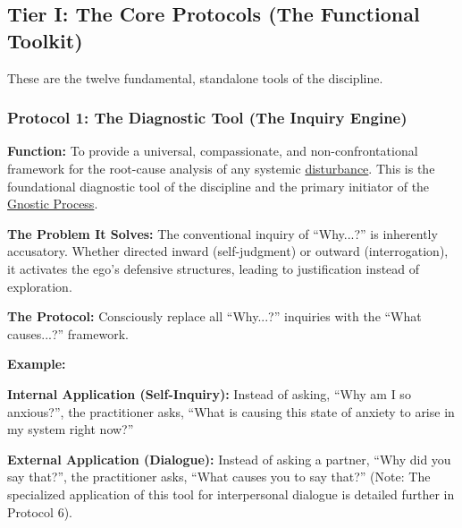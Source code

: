 \documentclass{article}
\begin{document}
\subsection*{Tier I: The Core Protocols (The Functional Toolkit)}
These are the twelve fundamental, standalone tools of the discipline.

\subsubsection*{Protocol 1: The Diagnostic Tool (The Inquiry Engine)} \label{protocol_1_the_diagnostic_tool_the_inquiry_engine}
\begin{nobullet}
        \item \textbf{Function:} To provide a universal, compassionate, and non-confrontational framework for the root-cause analysis of any systemic \hyperlink{gloss:disturbance}{disturbance}. This is the foundational diagnostic tool of the discipline and the primary initiator of the \hyperlink{gloss:gnostic_process}{Gnostic Process}.

        \item \textbf{The Problem It Solves:} The conventional inquiry of ``Why...?'' is inherently accusatory. Whether directed inward (self-judgment) or outward (interrogation), it activates the ego's defensive structures, leading to justification instead of exploration.

        \item \textbf{The Protocol:} Consciously replace all ``Why...?'' inquiries with the ``What causes...?'' framework.

        \bigskip
        \item \textbf{Example:}~
        \begin{nobullet}
            \item \textbf{Internal Application (Self-Inquiry):} Instead of asking, ``Why am I so anxious?'', the practitioner asks, ``What is causing this state of anxiety to arise in my system right now?''
            \item \textbf{External Application (Dialogue):} Instead of asking a partner, ``Why did you say that?'', the practitioner asks, ``What causes you to say that?'' (Note: The specialized application of this tool for interpersonal dialogue is detailed further in Protocol 6).
        \end{nobullet}


\end{nobullet}
\end{document}
